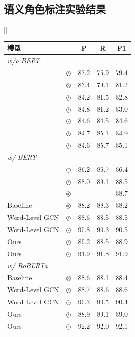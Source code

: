 \subsection{语义角色标注实验结果}[]


\begin{table}[htpb]
    \vspace{0.5em}\centering\wuhao
    \begin{tabular}{lcccc}
        \toprule[1.5pt]
        模型 & & P & R & F1 \\
        \midrule[1pt]
        \multicolumn{4}{l}{\textit{w/o BERT}}  \\
        \citet{roth-lapata-2016-neural} & $\oslash$ & 83.2 & 75.9 & 79.4 \\
        \citet{marcheggiani-etal-2017-simple} & $\otimes$ & 83.4 & 79.1 & 81.2 \\
        \citet{he-etal-2018-syntax} & $\oslash$ & 84.2 & 81.5 & 82.8 \\
        \citet{li-etal-2018-unified} & $\oslash$ & 84.8 & 81.2 & 83.0 \\
        \citet{he-etal-2019-syntax} & $\odot$ & 84.6 & 84.5 & 84.6 \\
        \citet{munir-etal-2021-adaptive} & $\oslash$ & 84.7 & 85.1 & 84.9 \\
        \citet{xia-etal-2019-syntax} & $\oslash$ & 84.6 & 85.7 & 85.1 \\
        \hline
        \multicolumn{4}{l}{\textit{w/ BERT}}  \\
        \citet{he-etal-2019-syntax} & $\odot$ & 86.2 & 86.7 & 86.4 \\
        \citet{xia-etal-2019-syntax} & $\oslash$ & 88.0 & 89.1 & 88.5 \\
        \citet{li-etal-2020-high} & $\otimes$ & -	& - & 88.7 \\
        Baseline & $\otimes$ & 88.2 & 88.3 & 88.2 \\
        Word-Level GCN & $\oslash$ & 88.6 & 88.5 & 88.5 \\
        Word-Level GCN & $\odot$ & 90.8 & 90.3 & 90.5  \\
        Ours & $\oslash$ & 89.2 & 88.5 & 88.9 \\
        Ours & $\odot$ & 91.9 & 91.8 & 91.9  \\
        \hline
        \multicolumn{4}{l}{\textit{w/ RoBERTa}}  \\
        Baseline & $\otimes$ & 88.6 & 88.1 & 88.4 \\
        Word-Level GCN &$\oslash$ & 88.7 & 88.6 & 88.6 \\
        Word-Level GCN &$\odot$ & 90.3 & 90.5 & 90.4 \\
        Ours &$\oslash$ & 88.9 & 89.1 & 89.0 \\
        Ours &$\odot$ & 92.2 & 92.0 & 92.1 \\
        \bottomrule[1.5pt]
    \end{tabular}
\end{table}



